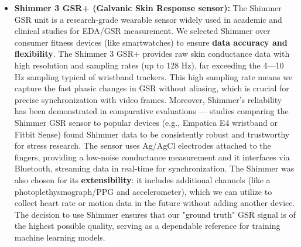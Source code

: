 \begin{itemize}
\item \textbf{Shimmer 3 GSR+ (Galvanic Skin Response sensor):} The Shimmer GSR
  unit is a research-grade wearable sensor widely used in academic and
  clinical studies for EDA/GSR measurement. We selected Shimmer over
  consumer fitness devices (like smartwatches) to ensure \textbf{data accuracy
  and flexibility}. The Shimmer 3 GSR+ provides raw skin conductance
  data with high resolution and sampling rates (up to 128
  Hz)\cite{GSRPPGMachineLearning2024},
  far exceeding the 4---10 Hz sampling typical of wristband trackers.
  This high sampling rate means we capture the fast phasic changes in
  GSR without aliasing, which is crucial for precise synchronization
  with video frames. Moreover, Shimmer's reliability has been
  demonstrated in comparative evaluations --- studies comparing the
  Shimmer GSR sensor to popular devices (e.g., Empatica E4 wristband or
  Fitbit Sense) found Shimmer data to be consistently robust and
  trustworthy for stress
  research\cite{GSRPPGMachineLearning2024}.
  The sensor uses Ag/AgCl electrodes attached to the fingers, providing
  a low-noise conductance measurement and it interfaces via Bluetooth,
  streaming data in real-time for synchronization. The Shimmer was also
  chosen for its \textbf{extensibility}: it includes additional channels
  (like a photoplethysmograph/PPG and accelerometer), which we can
  utilize to collect heart rate or motion data in the future without
  adding another
  device\cite{GSRPPGMachineLearning2024}.
  The decision to use Shimmer ensures that our "ground truth" GSR signal
  is of the highest possible quality, serving as a dependable reference
  for training machine learning models.


\end{itemize}
